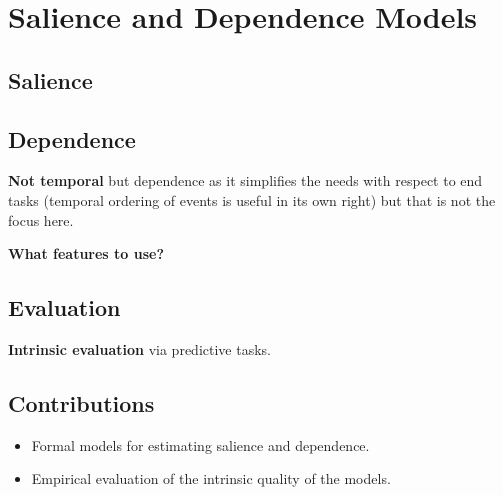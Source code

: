 \section{Salience and Dependence Models}

\subsection{Salience}

\subsection{Dependence}

\textbf{Not temporal} but dependence as it simplifies the needs with respect to end tasks (temporal ordering of events is useful in its own right) but that is not the focus here.

\textbf{What features to use?}

\subsection{Evaluation}

\textbf{Intrinsic evaluation} via predictive tasks. 


\subsection{Contributions}
\begin{itemize}
\item Formal models for estimating salience and dependence.
\item Empirical evaluation of the intrinsic quality of the models. 
\end{itemize}
